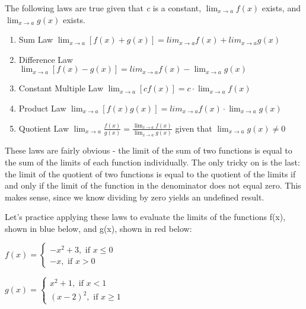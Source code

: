 The following laws are true given that \textit{c} is a constant, $\lim_{x\to a} f(x) $ exists, and $\lim_{x\to a} g(x) $ exists.

\begin{enumerate}
    \item Sum Law $\lim_{x\to a} \left[f(x) + g(x) \right] = lim_{x\to a} f(x) + lim_{x\to a} g(x)$
    \item Difference Law $\lim_{x\to a} \left[f(x) - g(x) \right] = lim_{x\to a} f(x) - \lim_{x\to a} g(x)$
    \item Constant Multiple Law $\lim_{x\to a} \left[\textit{c}f(x) \right] = \textit{c} \cdot \lim_{x\to a}    f(x) $
    \item Product Law $\lim_{x\to a} \left[f(x)g(x) \right] = lim_{x\to a}f(x) \cdot \lim_{x\to a} g(x)$
    \item Quotient Law $\lim_{x\to a} \frac{f(x)}{g(x)} = \frac{\lim_{x\to a} f(x)}{\lim_{x\to a} g(x)}$ given that $\lim_{x\to a} g(x) \neq 0$
\end{enumerate}
These laws are fairly obvious - the limit of the sum of two functions is equal to the sum of the limits of each function individually. The only tricky on is the last: the limit of the quotient of two functions is equal to the quotient of the limits if and only if the limit of the function in the denominator does not equal zero. This makes sense, since we know dividing by zero yields an undefined result. 

Let's practice applying these laws to evaluate the limits of the functions f(x), shown in blue below, and g(x), shown in red below:

$f(x) = \begin{cases}
    -x^2+3, \text{ if } x \leq 0\\
    -x, \text{ if } x > 0
\end{cases}$

$g(x) = \begin{cases}
   x^2+1, \text{ if } x < 1 \\
    (x-2)^2, \text{ if } x \geq 1
\end{cases}$



